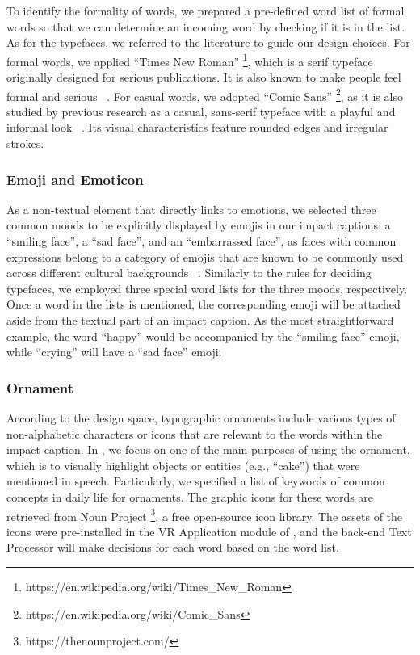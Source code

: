 To identify the formality of words, we prepared a pre-defined word list of formal words so that we can determine an incoming word by checking if it is in the list.
As for the typefaces, we referred to the literature to guide our design choices.
For formal words, we applied ``Times New Roman'' \footnote{https://en.wikipedia.org/wiki/Times\_New\_Roman}, which is a serif typeface originally designed for serious publications. It is also known to make people feel formal and serious ~\cite{mackiewicz2004people}.
For casual words, we adopted ``Comic Sans'' \footnote{https://en.wikipedia.org/wiki/Comic\_Sans}, as it is also studied by previous research as a casual, sans-serif typeface with a playful and informal look ~\cite{amare2012seeing}. Its visual characteristics feature rounded edges and irregular strokes.


\subsubsection{Emoji and Emoticon}
As a non-textual element that directly links to emotions, we selected three common moods to be explicitly displayed by emojis in our impact captions: a ``smiling face'', a ``sad face'', and an ``embarrassed face'', as faces with common expressions belong to a category of emojis that are known to be commonly used across different cultural backgrounds ~\cite{czkestochowska2022context}.
Similarly to the rules for deciding typefaces, we employed three special word lists for the three moods, respectively. Once a word in the lists is mentioned, the corresponding emoji will be attached aside from the textual part of an impact caption. As the most straightforward example, the word ``happy'' would be accompanied by the ``smiling face'' emoji, while ``crying'' will have a ``sad face'' emoji.

\subsubsection{Ornament}
According to the design space, typographic ornaments include various types of non-alphabetic characters or icons that are relevant to the words within the impact caption. In \system{}, we focus on one of the main purposes of using the ornament, which is to visually highlight objects or entities (e.g., ``cake'') that were mentioned in speech. 
Particularly, we specified a list of keywords of common concepts in daily life for ornaments. The graphic icons for these words are retrieved from Noun Project \footnote{https://thenounproject.com/}, a free open-source icon library. 
The assets of the icons were pre-installed in the VR Application module of \system{}, and the back-end Text Processor will make decisions for each word based on the word list. 


